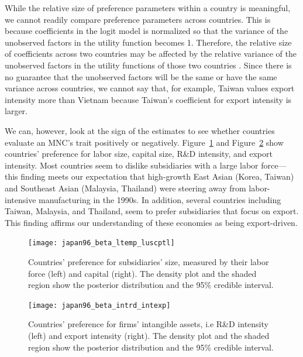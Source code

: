 While the relative size of preference parameters within a country is meaningful,
we cannot readily compare preference parameters across countries. This is
because coefficients in the logit model is normalized so that the variance of
the unobserved factors in the utility function becomes 1. Therefore, the
relative size of coefficients across two countries may be affected by the
relative variance of the unobserved factors in the utility functions of those
two countries \citep[chap. 2]{Train2009}. Since there is no guarantee that the
unobserved factors will be the same or have the same variance across countries,
we cannot say that, for example, Taiwan values export intensity more than
Vietnam because Taiwan's coefficient for export intensity is larger.

We can, however, look at the sign of the estimates to see whether countries
evaluate an MNC's trait positively or negatively.
Figure~\ref{fig:japan96_beta_ltemp_luscptl} and
Figure~\ref{fig:japan96_beta_intrd_intexp} show countries' preference for labor
size, capital size, R\&D intensity, and export intensity. Most countries seem to
dislike subsidiaries with a large labor force---this finding meets our
expectation that high-growth East Asian (Korea, Taiwan) and Southeast Asian
(Malaysia, Thailand) were steering away from labor-intensive manufacturing in
the 1990s. In addition, several countries including Taiwan, Malaysia, and
Thailand, seem to prefer subsidiaries that focus on export. This finding affirms
our understanding of these economies as being export-driven.

\begin{figure}[tbp] \centering
  \texttt{[image: japan96\_beta\_ltemp\_luscptl]}
  \caption[Countries' preference for subsidiaries' size.]{Countries' preference
    for subsidiaries' size, measured by their labor force (left) and capital
    (right). The density plot and the shaded region show the posterior
    distribution and the 95\% credible interval.}
  \label{fig:japan96_beta_ltemp_luscptl}
\end{figure}

\begin{figure}[tbp] \centering
  \texttt{[image: japan96\_beta\_intrd\_intexp]}
  \caption[Countries' preference for firms' intangible assets.]{Countries'
    preference for firms' intangible assets, i.e R\&D intensity (left) and
    export intensity (right). The density plot and the shaded region show the
    posterior distribution and the 95\% credible interval.}
  \label{fig:japan96_beta_intrd_intexp}
\end{figure}

